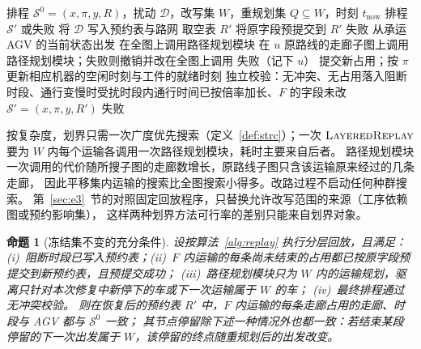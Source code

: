\documentclass[manuscript,screen,review]{acmart}
\newtheorem{prop}{命题}
\begin{document}
\begin{algorithm}[t]
\caption{分层回放 \(\textsc{LayeredReplay}\)}
\label{alg:replay}
\begin{algorithmic}[1]
\Require 排程 \(\mathcal{S}^0=(x,\pi,y,R)\)，扰动 \(\mathcal{D}\)，改写集 \(W\)，重规划集 \(Q\subseteq W\)，时刻 \(t_{\mathrm{now}}\)
\Ensure 排程 \(\mathcal{S}'\) 或失败
\State 将 \(\mathcal{D}\) 写入预约表与路网
\State 取空表 \(R'\)
  \State 将原字段预提交到 \(R'\)
    \State \Return 失败
  \EndIf
\EndFor
{}
  \State 从承运 AGV 的当前状态出发
    \State 在全图上调用路径规划模块
  \Else
    \State 在 \(u\) 原路线的走廊子图上调用路径规划模块；失败则撤销并改在全图上调用 
  \EndIf
    \State \Return 失败（记下 \(u\)）
  \EndIf
  \State 提交新占用；按 \(\pi\) 更新相应机器的空闲时刻与工件的就绪时刻
\EndFor
\State 独立校验：无冲突、无占用落入阻断时段、通行变慢时受扰时段内通行时间已按倍率加长、\(F\) 的字段未改
  \State \Return \(\mathcal{S}'=(x,\pi,y,R')\)
\Else
  \State \Return 失败
\EndIf
\end{algorithmic}
\end{algorithm}

按复杂度，划界只需一次广度优先搜索（定义~\ref{def:strc}）；一次 \(\textsc{LayeredReplay}\)
要为 \(W\) 内每个运输各调用一次路径规划模块，耗时主要来自后者。
路径规划模块一次调用的代价随所搜子图的走廊数增长，原路线子图只含该运输原来经过的几条走廊，
因此平移集内运输的搜索比全图搜索小得多。改路过程不启动任何种群搜索。
第~\ref{sec:e3}~节的对照固定回放程序，只替换允许改写范围的来源（工序依赖图或预约影响集），
这样两种划界方法可行率的差别只能来自划界对象。

\begin{prop}[冻结集不变的充分条件]
\label{prop:outside}
设按算法~\ref{alg:replay} 执行分层回放，且满足：
(i)~阻断时段已写入预约表；(ii)~\(F\) 内运输的每条尚未结束的占用都已按原字段预提交到新预约表，且预提交成功；
(iii)~路径规划模块只为 \(W\) 内的运输规划，驱离只针对本次修复中新停下的车或下一次运输属于 \(W\) 的车；
(iv)~最终排程通过无冲突校验。
则在恢复后的预约表 \(R'\) 中，\(F\) 内运输的每条走廊占用的走廊、时段与 AGV 都与 \(\mathcal{S}^0\) 一致；
其节点停留除下述一种情况外也都一致：若结束某段停留的下一次出发属于 \(W\)，该停留的终点随重规划后的出发改变。
\end{prop}
\end{document}
